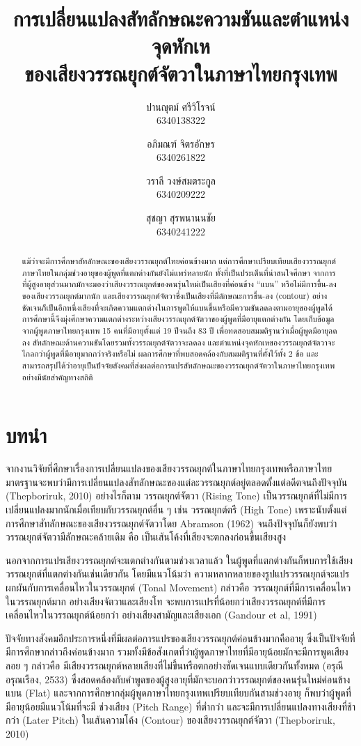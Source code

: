 \documentclass[a4paper]{article}
\title{การเปลี่ยนแปลงสัทลักษณะความชันและตำแหน่งจุดหักเห\\ของเสียงวรรณยุกต์จัตวาในภาษาไทยกรุงเทพ}
\author{
    ปานญุตม์ ศรีวิโรจน์\\6340138322
    \and
    อภิมณฑ์ จิตรอักษร\\6340261822
    \and
    วราลี วงษ์สมตระกูล\\6340209222
    \and
    สุชญา สุรพนานนชัย\\6340241222
}
\date{}
\begin{document}
\maketitle
\begin{abstract}
    แม้ว่าจะมีการศึกษาสัทลักษณะของเสียงวรรณยุกต์ไทยค่อนข้างมาก แต่การศึกษาเปรียบเทียบเสียงวรรณยุกต์ภาษาไทยในกลุ่มช่วงอายุของผู้พูดที่แตกต่างกันยังไม่แพร่หลายนัก ทั้งที่เป็นประเด็นที่น่าสนใจศึกษา จากการที่ผู้สูงอายุส่วนมากมักจะมองว่าเสียงวรรณยุกต์ของคนรุ่นใหม่เป็นเสียงที่ค่อนข้าง “แบน” หรือไม่มีการขึ้น-ลงของเสียงวรรณยุกต์มากนัก  และเสียงวรรณยุกต์จัตวาซึ่งเป็นเสียงที่มีลักษณะการขึ้น-ลง (contour) อย่างชัดเจนก็เป็นอีกหนึ่งเสียงที่จะเกิดความแตกต่างในการพูดให้แบนขึ้นหรือมีความชันลดลงตามอายุของผู้พูดได้ การศึกษานี้จึงมุ่งศึกษาความแตกต่างระหว่างเสียงวรรณยุกต์จัตวาของผู้พูดที่มีอายุแตกต่างกัน โดยเก็บข้อมูลจากผู้พูดภาษาไทยกรุงเทพ 15 คนที่มีอายุตั้งแต่ 19 ปีจนถึง 83 ปี เพื่อทดสอบสมมติฐานว่าเมื่อผู้พูดมีอายุลดลง สัทลักษณะด้านความชันโดยรวมทั้งวรรณยุกต์จัตวาจะลดลง และตำแหน่งจุดหักเหของวรรณยุกต์จัตวาจะไกลกว่าผู้พูดที่มีอายุมากกว่าจริงหรือไม่ ผลการศึกษาที่พบสอดคล้องกับสมมติฐานที่ตั้งไว้ทั้ง 2 ข้อ และสามารถสรุปได้ว่าอายุเป็นปัจจัยสังคมที่ส่งผลต่อการแปรสัทลักษณะของวรรณยุกต์จัตวาในภาษาไทยกรุงเทพอย่างมีนัยสำคัญทางสถิติ
\end{abstract}
\section{บทนำ}
    จากงานวิจัยที่ศึกษาเรื่องการเปลี่ยนแปลงของเสียงวรรณยุกต์ในภาษาไทยกรุงเทพหรือภาษาไทยมาตรฐานจะพบว่ามีการเปลี่ยนแปลงสัทลักษณะของแต่ละวรรณยุกต์อยู่ตลอดตั้งแต่อดีตจนถึงปัจจุบัน (Thepboriruk, 2010) อย่างไรก็ตาม วรรณยุกต์จัตวา (Rising Tone) เป็นวรรณยุกต์ที่ไม่มีการเปลี่ยนแปลงมากนักเมื่อเทียบกับวรรณยุกต์อื่น ๆ เช่น วรรณยุกต์ตรี (High Tone) เพราะนับตั้งแต่การศึกษาสัทลักษณะของเสียงวรรณยุกต์จัตวาโดย Abramson (1962) จนถึงปัจจุบันก็ยังพบว่าวรรณยุกต์จัตวามีลักษณะคล้ายเดิม คือ เป็นเส้นโค้งที่เสียงจะตกลงก่อนขึ้นเสียงสูง

    นอกจากการแปรเสียงวรรณยุกต์จะแตกต่างกันตามช่วงเวลาแล้ว ในผู้พูดที่แตกต่างกันก็พบการใช้เสียงวรรณยุกต์ที่แตกต่างกันเช่นเดียวกัน โดยมีแนวโน้มว่า ความหลากหลายของรูปแปรวรรณยุกต์จะแปรผกผันกับการเคลื่อนไหวในวรรณยุกต์ (Tonal Movement) กล่าวคือ วรรณยุกต์ที่มีการเคลื่อนไหวในวรรณยุกต์มาก อย่างเสียงจัตวาและเสียงโท จะพบการแปรที่น้อยกว่าเสียงวรรณยุกต์ที่มีการเคลื่อนไหวในวรรณยุกต์น้อยกว่า อย่างเสียงสามัญและเสียงเอก (Gandour et al, 1991)

    ปัจจัยทางสังคมอีกประการหนึ่งที่มีผลต่อการแปรของเสียงวรรณยุกต์ค่อนข้างมากคืออายุ ซึ่งเป็นปัจจัยที่มีการศึกษากล่าวถึงค่อนข้างมาก รวมทั้งมีข้อสังเกตที่ว่าผู้พูดภาษาไทยที่มีอายุน้อยมักจะมีการพูดเสียงลอย ๆ กล่าวคือ มีเสียงวรรณยุกต์หลายเสียงที่ไม่ขึ้นหรือตกอย่างชัดเจนแบบเดียวกันทั้งหมด (อรุณี อรุณเรือง, 2533) ซึ่งสอดคล้องกับคำพูดของผู้สูงอายุที่มักจะบอกว่าวรรณยุกต์ของคนรุ่นใหม่ค่อนข้างแบน (Flat) และจากการศึกษากลุ่มผู้พูดภาษาไทยกรุงเทพเปรียบเทียบกันสามช่วงอายุ ก็พบว่าผู้พูดที่มีอายุน้อยมีแนวโน้มที่จะมี ช่วงเสียง (Pitch Range) ที่ต่ำกว่า และจะมีการเปลี่ยนแปลงทางเสียงที่ช้ากว่า (Later Pitch) ในเส้นความโค้ง (Contour) ของเสียงวรรณยุกต์จัตวา (Thepboriruk, 2010)
\end{document}
